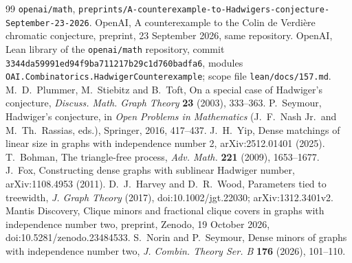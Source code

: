 \documentclass[11pt]{article}
\theoremstyle{definition}\newtheorem{conjecture}[theorem]{Conjecture}
\theoremstyle{remark}\newtheorem{remark}[theorem]{Remark}
\begin{document}
\begin{thebibliography}{99}
\texttt{openai/math}, \nolinkurl{preprints/A-counterexample-to-Hadwigers-conjecture-September-23-2026}.
 OpenAI, A counterexample to the Colin de Verdi\`ere chromatic conjecture, preprint, 23 September 2026, same repository.
 OpenAI, Lean library of the \texttt{openai/math} repository, commit \texttt{3344da59991ed94f9ba711217b29c1d760badfa6}, modules
\texttt{OAI.Combinatorics.HadwigerCounterexample}; scope file \texttt{lean/docs/157.md}.
 M.~D.~Plummer, M.~Stiebitz and B.~Toft, On a special case of Hadwiger's conjecture, \emph{Discuss. Math. Graph
Theory} \textbf{23} (2003), 333--363.
 P.~Seymour, Hadwiger's conjecture, in \emph{Open Problems in Mathematics} (J.~F.~Nash Jr.\ and M.~Th.~Rassias,
eds.), Springer, 2016, 417--437.
 J.~H.~Yip, Dense matchings of linear size in graphs with independence number 2, arXiv:2512.01401 (2025).
 T.~Bohman, The triangle-free process, \emph{Adv. Math.} \textbf{221} (2009), 1653--1677.
 J.~Fox, Constructing dense graphs with sublinear Hadwiger number, arXiv:1108.4953 (2011).
 D.~J.~Harvey and D.~R.~Wood, Parameters tied to treewidth, \emph{J. Graph Theory} (2017),
  doi:10.1002/jgt.22030; arXiv:1312.3401v2.
 Mantis Discovery, Clique minors and fractional clique covers in graphs with independence number two,
  preprint, Zenodo, 19 October 2026, doi:10.5281/zenodo.23484533.
 S.~Norin and P.~Seymour, Dense minors of graphs with independence number two, \emph{J. Combin. Theory
  Ser. B} \textbf{176} (2026), 101--110.
\end{thebibliography}
\end{document}
